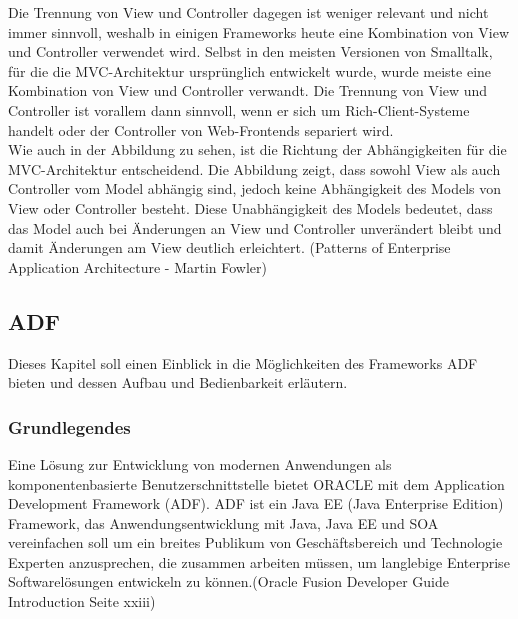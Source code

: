 Die Trennung von View und Controller dagegen ist weniger relevant und nicht immer sinnvoll, weshalb in einigen Frameworks heute eine Kombination von View und Controller verwendet wird. Selbst in den meisten Versionen von Smalltalk, für die die MVC-Architektur ursprünglich entwickelt wurde, wurde meiste eine Kombination von View und Controller verwandt. Die Trennung von View und Controller ist vorallem dann sinnvoll, wenn er sich um Rich-Client-Systeme handelt oder der Controller von Web-Frontends separiert wird.\\
Wie auch in der Abbildung zu sehen, ist die Richtung der Abhängigkeiten für die MVC-Architektur entscheidend. Die Abbildung zeigt, dass sowohl View als auch Controller vom Model abhängig sind, jedoch keine Abhängigkeit des Models von View oder Controller besteht. Diese Unabhängigkeit des Models bedeutet, dass das Model auch bei Änderungen an View und Controller unverändert bleibt und damit Änderungen am View deutlich erleichtert.
(Patterns of Enterprise Application Architecture - Martin Fowler)
\subsection{ADF}
Dieses Kapitel soll einen Einblick in die Möglichkeiten des Frameworks ADF bieten und dessen Aufbau und Bedienbarkeit erläutern.

\subsubsection{Grundlegendes}

Eine Lösung zur Entwicklung von modernen Anwendungen als komponentenbasierte Benutzerschnittstelle bietet ORACLE mit dem Application Development Framework (ADF). ADF ist ein Java EE (Java Enterprise Edition) Framework, das Anwendungsentwicklung mit Java, Java EE und SOA vereinfachen soll um ein breites Publikum von Geschäftsbereich und Technologie Experten anzusprechen, die zusammen arbeiten müssen, um langlebige Enterprise Softwarelösungen entwickeln zu können.(Oracle Fusion Developer Guide Introduction Seite xxiii)
